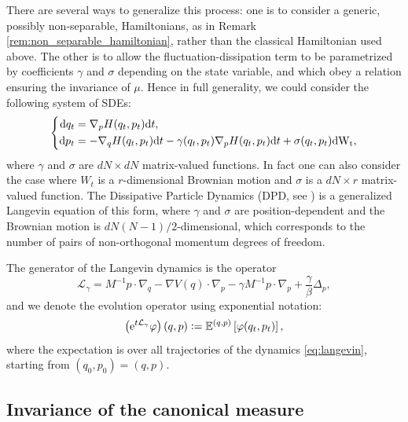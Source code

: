 \begin{remark}
    There are several ways to generalize this process: one is to consider a generic, possibly non-separable, Hamiltonians, as in Remark \ref{rem:non_separable_hamiltonian}, rather than the classical Hamiltonian used above.
    The other is to allow the fluctuation-dissipation term to be parametrized by coefficients $\gamma$ and $\sigma$ depending on the state variable, and which obey a relation ensuring the invariance of $\mu$.
    Hence in full generality, we could consider the following system of SDEs:
    \begin{equation}
        \label{eq:general_langevin}
        \left\{\begin{aligned}
            \text dq_t &=\nabla_p H(q_t,p_t)\mathrm{d}t,\\
            \text dp_t &= -\nabla_q H(q_t,p_t)\mathrm{d}t -\gamma(q_t,p_t)\nabla_pH(q_t,p_t)\mathrm{d}t+\sigma(q_t,p_t)\rm{d}W_t,
        \end{aligned}\right.
    \end{equation}
    where $\gamma$ and $\sigma$ are $dN \times dN$ matrix-valued functions.
    In fact one can also consider the case where $W_t$ is a $r$-dimensional Brownian motion and $\sigma$ is a $dN\times r$ matrix-valued function.
    The Dissipative Particle Dynamics (DPD, see \cite{EW95}) is a generalized Langevin equation of this form, where $\gamma$ and $\sigma$ are position-dependent and the Brownian motion is $dN(N-1)/2$-dimensional, which corresponds to the number of pairs of non-orthogonal momentum degrees of freedom.
\end{remark}

The generator of the Langevin dynamics is the operator
\begin{equation}
  \label{eq:langevin_generator}
\mathcal L_\gamma=M^{-1}p\cdot \nabla_q-\nabla V(q) \cdot \nabla_p- \gamma M^{-1} p \cdot \nabla_p+\frac\gamma\beta \Delta_p,
\end{equation}
and we denote the evolution operator using exponential notation:
\begin{equation}
    \label{eq:langevin_evolution_operator}
    \left(\mathrm{e}^{t\mathcal{L}_\gamma}\varphi\right)(q,p) \mathrel{\mathop:}= \mathbb{E}^{(q,p)}\left[\varphi(q_t,p_t)\right],
\end{equation}
where the expectation is over all trajectories of the dynamics \eqref{eq:langevin}, starting from $(q_0,p_0)=(q,p)$.

    \subsection{Invariance of the canonical measure}

